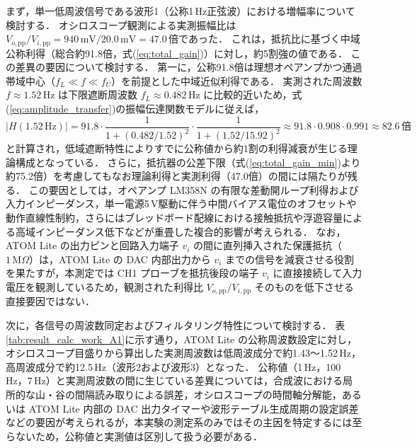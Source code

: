まず，単一低周波信号である波形1（公称1\,Hz正弦波）における増幅率について検討する．
オシロスコープ観測による実測振幅比は $V_{o,\mathrm{pp}}/V_{i,\mathrm{pp}} = 940\,\mathrm{mV} / 20.0\,\mathrm{mV} = 47.0$\,倍であった．
これは，抵抗比に基づく中域公称利得（総合約91.8倍，式(\ref{eq:total_gain})）に対し，約5割強の値である．
この差異の要因について検討する．
第一に，公称91.8倍は理想オペアンプかつ通過帯域中心（$f_L \ll f \ll f_U$）を前提とした中域近似利得である．
実測された周波数 $f \approx 1.52\,\mathrm{Hz}$ は下限遮断周波数 $f_L \approx 0.482\,\mathrm{Hz}$ に比較的近いため，式(\ref{eq:amplitude_transfer})の振幅伝達関数モデルに従えば，
\begin{equation}
  |H(1.52\,\mathrm{Hz})| = 91.8 \cdot \frac{1}{1 + (0.482/1.52)^2} \cdot \frac{1}{1 + (1.52/15.92)^2} \approx 91.8 \cdot 0.908 \cdot 0.991 \approx 82.6\,\text{倍}
\end{equation}
と計算され，低域遮断特性によりすでに公称値から約1割の利得減衰が生じる理論構成となっている．
さらに，抵抗器の公差下限（式(\ref{eq:total_gain_min})より約75.2倍）を考慮してもなお理論利得と実測利得（47.0倍）の間には隔たりが残る．
この要因としては，オペアンプ LM358N の有限な差動開ループ利得および入力インピーダンス，単一電源5\,V駆動に伴う中間バイアス電位のオフセットや動作直線性制約，さらにはブレッドボード配線における接触抵抗や浮遊容量による高域インピーダンス低下などが重畳した複合的影響が考えられる．
なお，ATOM Lite の出力ピンと回路入力端子 $v_i$ の間に直列挿入された保護抵抗（$1\,\mathrm{M}\Omega$）は，ATOM Lite の DAC 内部出力から $v_i$ までの信号を減衰させる役割を果たすが，本測定では CH1 プローブを抵抗後段の端子 $v_i$ に直接接続して入力電圧を観測しているため，観測された利得比 $V_{o,\mathrm{pp}}/V_{i,\mathrm{pp}}$ そのものを低下させる直接要因ではない．

次に，各信号の周波数同定およびフィルタリング特性について検討する．
表\ref{tab:result_calc_work_A1}に示す通り，ATOM Lite の公称周波数設定に対し，オシロスコープ目盛りから算出した実測周波数は低周波成分で約1.43〜1.52\,Hz，高周波成分で約12.5\,Hz（波形2および波形3）となった．
公称値（1\,Hz，100\,Hz，7\,Hz）と実測周波数の間に生じている差異については，合成波における局所的な山・谷の間隔読み取りによる誤差，オシロスコープの時間軸分解能，あるいは ATOM Lite 内部の DAC 出力タイマーや波形テーブル生成周期の設定誤差などの要因が考えられるが，本実験の測定系のみではその主因を特定するには至らないため，公称値と実測値は区別して扱う必要がある．

